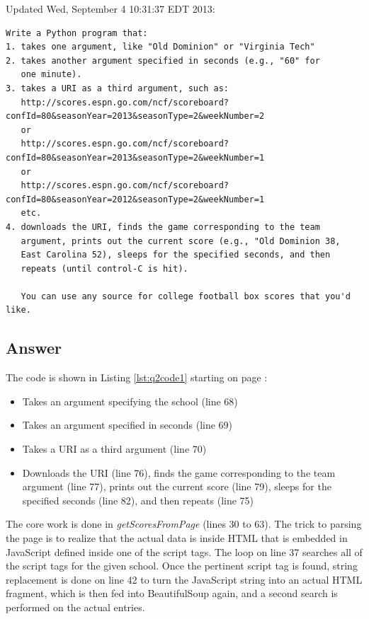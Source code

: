 \documentclass[letterpaper,11pt]{article}
\begin{document}
\vfill
Updated Wed, September 4 10:31:37 EDT 2013:
\begingroup
\fontsize{8pt}{10pt}\selectfont
\begin{verbatim}
Write a Python program that:
1. takes one argument, like "Old Dominion" or "Virginia Tech"
2. takes another argument specified in seconds (e.g., "60" for 
   one minute).
3. takes a URI as a third argument, such as:
   http://scores.espn.go.com/ncf/scoreboard?confId=80&seasonYear=2013&seasonType=2&weekNumber=2
   or
   http://scores.espn.go.com/ncf/scoreboard?confId=80&seasonYear=2013&seasonType=2&weekNumber=1
   or
   http://scores.espn.go.com/ncf/scoreboard?confId=80&seasonYear=2012&seasonType=2&weekNumber=1
   etc.
4. downloads the URI, finds the game corresponding to the team
   argument, prints out the current score (e.g., "Old Dominion 38, 
   East Carolina 52), sleeps for the specified seconds, and then
   repeats (until control-C is hit).

   You can use any source for college football box scores that you'd like.
\end{verbatim}
\endgroup


\newpage
\subsection*{Answer}



\newpage
The code is shown in Listing \ref{lst:q2code1} starting on page \pageref{lst:q2code1}:
\begin{itemize}
\item Takes an argument specifying the school (line 68)
\item Takes an argument specified in seconds (line 69)
\item Takes a URI as a third argument (line 70)
\item Downloads the URI (line 76), finds the game corresponding to the team argument (line 77), prints out the current score (line 79), sleeps for the specified seconds (line 82), and then repeats (line 75)
\end{itemize}

The core work is done in \emph{getScoresFromPage} (lines 30 to 63).  The trick to parsing the page is to realize that the actual data is inside HTML that is embedded in JavaScript defined inside one of the script tags.  The loop on line 37 searches all of the script tags for the given school.  Once the pertinent script tag is found, string replacement is done on line 42 to turn the JavaScript string into an actual HTML fragment, which is then fed into BeautifulSoup again, and a second search is performed on the actual entries.
\end{document}
